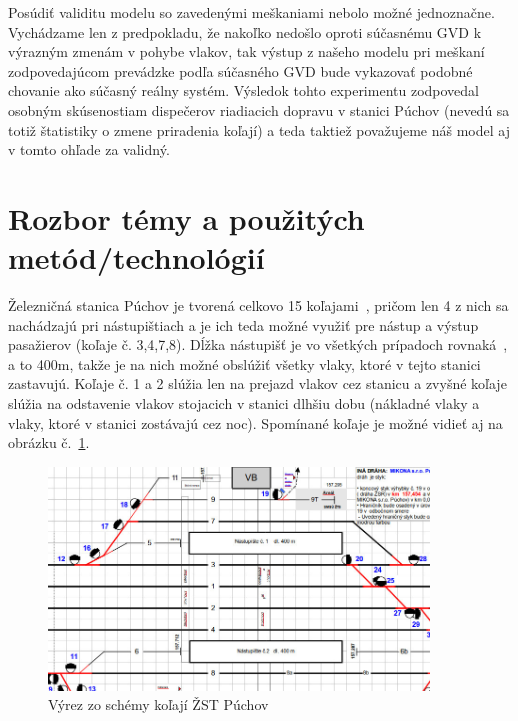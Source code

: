 \documentclass[12pt,a4paper,titlepage,final]{article}
\begin{document}
Posúdiť validitu modelu so zavedenými meškaniami nebolo možné jednoznačne. Vychádzame
len z predpokladu, že nakoľko nedošlo oproti súčasnému GVD k výrazným zmenám v pohybe
vlakov, tak výstup z našeho modelu pri meškaní zodpovedajúcom prevádzke podľa súčasného GVD bude vykazovať podobné chovanie ako súčasný reálny systém. Výsledok
tohto experimentu zodpovedal osobným skúsenostiam dispečerov riadiacich dopravu v stanici Púchov (nevedú sa totiž štatistiky o zmene priradenia koľají) a teda taktiež považujeme náš model aj v tomto ohľade za validný.

\section{Rozbor témy a použitých metód/technológií} \label{sec:rozbor}

Železničná stanica Púchov je tvorená celkovo 15 koľajami~\cite{kolaje},
pričom len 4 z nich sa nachádzajú pri nástupištiach a je ich teda možné využiť
pre nástup a výstup pasažierov (koľaje č. 3,4,7,8). Dĺžka nástupišť je vo všetkých prípadoch rovnaká~\cite{kolaje}, a to 400m, takže je na nich možné obslúžiť všetky vlaky, ktoré v tejto stanici zastavujú. Koľaje č. 1 a 2 slúžia len na prejazd vlakov cez stanicu a zvyšné koľaje
slúžia na odstavenie vlakov stojacich v stanici dlhšiu dobu (nákladné vlaky a vlaky,
ktoré v stanici zostávajú cez noc). Spomínané koľaje je možné vidieť aj na obrázku č.~\ref{fig:kolaje}.

\begin{figure}[h]
	\centering
	\includegraphics[width=0.9\textwidth]{img/kolaje}
	\caption{Výrez zo schémy koľají ŽST Púchov} \label{fig:kolaje}
\end{figure}
\end{document}
